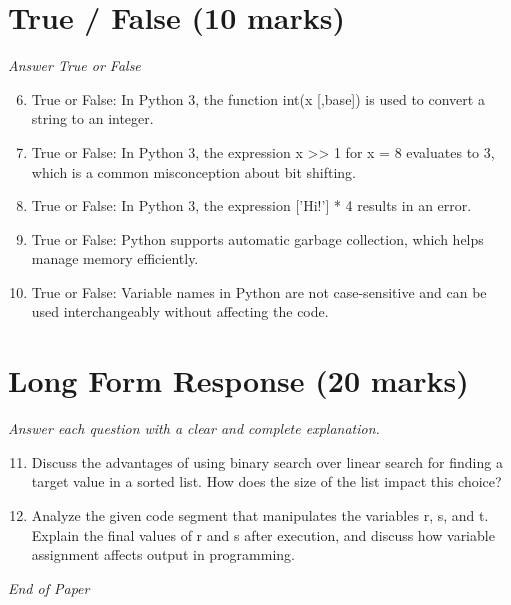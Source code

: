 \documentclass[12pt]{article}
\begin{document}
\section*{True / False (10 marks)}
\textit{Answer True or False}
\begin{enumerate}[label=\arabic*.]
\setcounter{enumi}{5}
\item True or False: In Python 3, the function int(x [,base]) is used to convert a string to an integer.
\item True or False: In Python 3, the expression x \textgreater{}\textgreater{} 1 for x = 8 evaluates to 3, which is a common misconception about bit shifting.
\item True or False: In Python 3, the expression ['Hi!'] * 4 results in an error.
\item True or False: Python supports automatic garbage collection, which helps manage memory efficiently.
\item True or False: Variable names in Python are not case-sensitive and can be used interchangeably without affecting the code.
\end{enumerate}

\section*{Long Form Response (20 marks)}
\textit{Answer each question with a clear and complete explanation.}
\begin{enumerate}[label=\arabic*.]
\setcounter{enumi}{10}
\item Discuss the advantages of using binary search over linear search for finding a target value in a sorted list. How does the size of the list impact this choice?
\item Analyze the given code segment that manipulates the variables r, s, and t. Explain the final values of r and s after execution, and discuss how variable assignment affects output in programming.
\end{enumerate}

\vfill
\noindent\textit{End of Paper}
\end{document}
